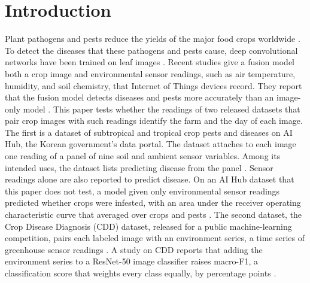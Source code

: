 \documentclass[preprint,12pt,authoryear,nopreprintline]{elsarticle}
\begin{document}
\linenumbers

\section{Introduction}
\label{sec:intro}

Plant pathogens and pests reduce the yields of the major food crops worldwide
\citep{savary2019burden}. To detect the diseases that these
pathogens and pests cause, deep convolutional networks have been trained on leaf images
\citep{mohanty2016deep}. Recent studies give a fusion model
both a crop image and environmental sensor readings, such as air temperature,
humidity, and soil chemistry, that Internet of Things devices record. They report
that the fusion model detects diseases and pests more accurately than an image-only
model \citep{jamun2025iot,partitioned2026,xu2025wheat}. This paper tests whether the
readings of two released datasets that pair crop images with such readings identify the
farm and the day of each image. The first is a dataset of subtropical and tropical crop pests and diseases on AI Hub, the
Korean government's data portal. The dataset attaches to each image one
reading of a panel of nine soil and ambient sensor variables. Among its intended uses, the
dataset lists predicting disease from the panel \citep{aihub2023subtropical}. Sensor readings alone are also reported to predict disease. On an AI Hub dataset that
this paper does not test, a model given only environmental sensor readings predicted whether crops were infested, with an area
under the receiver operating characteristic curve that averaged \leeYunAuroc{} over
crops and pests \citep{leeyun2023deep}. The second dataset, the Crop Disease Diagnosis (CDD) dataset, released for a public
machine-learning competition, pairs each labeled image with an environment series, a time series of
greenhouse sensor readings \citep{dacon2021cropdisease}. A study on CDD reports that
adding the environment series to a ResNet-50 image classifier raises macro-F1, a
classification score that weights every class equally, by \paperIncrement{}
percentage points \citep{appliedsci2024dacon}.
\end{document}
